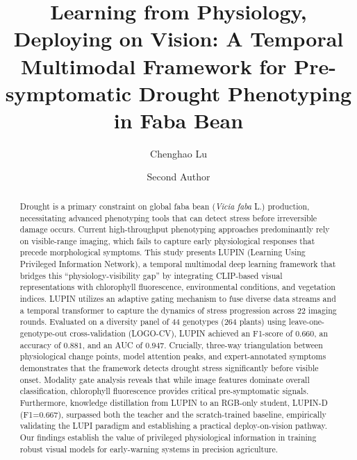 \documentclass[a4paper,fleqn]{cas-dc}
\begin{document}
\let\WriteBookmarks\relax
\def\floatpagepagefraction{1}
\def\textpagefraction{.001}


\title[mode = title]{Learning from Physiology, Deploying on Vision: A Temporal Multimodal Framework for Pre-symptomatic Drought Phenotyping in Faba Bean}

\author[1]{Chenghao Lu}
\cormark[1]

\author[1]{Second Author}



\begin{abstract}
Drought is a primary constraint on global faba bean (\textit{Vicia faba} L.) production, necessitating advanced phenotyping tools that can detect stress before irreversible damage occurs. Current high-throughput phenotyping approaches predominantly rely on visible-range imaging, which fails to capture early physiological responses that precede morphological symptoms. This study presents LUPIN (Learning Using Privileged Information Network), a temporal multimodal deep learning framework that bridges this ``physiology-visibility gap'' by integrating CLIP-based visual representations with chlorophyll fluorescence, environmental conditions, and vegetation indices. LUPIN utilizes an adaptive gating mechanism to fuse diverse data streams and a temporal transformer to capture the dynamics of stress progression across 22 imaging rounds. Evaluated on a diversity panel of 44 genotypes (264 plants) using leave-one-genotype-out cross-validation (LOGO-CV), LUPIN achieved an F1-score of $0.660$, an accuracy of $0.881$, and an AUC of $0.947$. Crucially, three-way triangulation between physiological change points, model attention peaks, and expert-annotated symptoms demonstrates that the framework detects drought stress significantly before visible onset. Modality gate analysis reveals that while image features dominate overall classification, chlorophyll fluorescence provides critical pre-symptomatic signals. Furthermore, knowledge distillation from LUPIN to an RGB-only student, LUPIN-D (F1=$0.667$), surpassed both the teacher and the scratch-trained baseline, empirically validating the LUPI paradigm and establishing a practical deploy-on-vision pathway. Our findings establish the value of privileged physiological information in training robust visual models for early-warning systems in precision agriculture.
\end{abstract}
\end{document}
